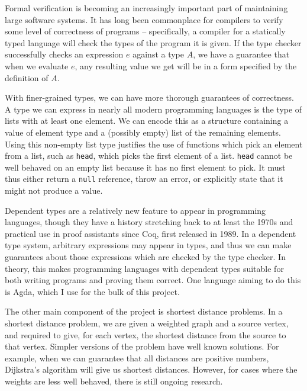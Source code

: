 Formal verification is becoming an increasingly important part of maintaining large software systems.
It has long been commonplace for compilers to verify some level of correctness of programs -- specifically, a compiler for a statically typed language will check the types of the program it is given.
If the type checker successfully checks an expression $e$ against a type $A$, we have a guarantee that when we evaluate $e$, any resulting value we get will be in a form specified by the definition of $A$.

With finer-grained types, we can have more thorough guarantees of correctness.
A type we can express in nearly all modern programming languages is the type of lists with at least one element.
We can encode this as a structure containing a value of element type and a (possibly empty) list of the remaining elements.
Using this non-empty list type justifies the use of functions which pick an element from a list, such as \texttt{head}, which picks the first element of a list.
\texttt{head} cannot be well behaved on an empty list because it has no first element to pick.
It must thus either return a \texttt{null} reference, throw an error, or explicitly state that it might not produce a value.

Dependent types are a relatively new feature to appear in programming languages, though they have a history stretching back to at least the 1970s\cite{martin-lof:aitot} and practical use in proof assistants since Coq\cite{CoqProofAssistant}, first released in 1989.
In a dependent type system, arbitrary expressions may appear in types, and thus we can make guarantees about those expressions which are checked by the type checker.
In theory, this makes programming languages with dependent types suitable for both writing programs and proving them correct.
One language aiming to do this is Agda\cite{Norell07}, which I use for the bulk of this project.

The other main component of the project is shortest distance problems.
In a shortest distance problem, we are given a weighted graph and a source vertex, and required to give, for each vertex, the shortest distance from the source to that vertex.
Simpler versions of the problem have well known solutions.
For example, when we can guarantee that all distances are positive numbers, Dijkstra's algorithm will give us shortest distances.
However, for cases where the weights are less well behaved, there is still ongoing research.

